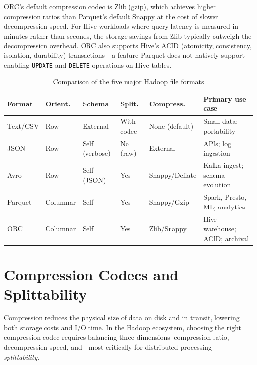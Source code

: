 ORC's default compression codec is Zlib (gzip), which achieves higher
compression ratios than Parquet's default Snappy at the cost of slower
decompression speed. For Hive workloads where query latency is measured
in minutes rather than seconds, the storage savings from Zlib typically
outweigh the decompression overhead. ORC also supports Hive's ACID
(atomicity, consistency, isolation, durability) transactions---a feature
Parquet does not natively support---enabling \texttt{UPDATE} and
\texttt{DELETE} operations on Hive tables.

\begin{table}[h!t]
\centering
\caption{Comparison of the five major Hadoop file formats}
\label{tab:format-comparison}
\renewcommand{\arraystretch}{1.5}
\begin{tabular}{L{1.6cm} L{1.6cm} L{2.0cm} L{1.4cm} L{1.8cm} L{2.6cm}}
\toprule
\textbf{Format} & \textbf{Orient.} & \textbf{Schema} & \textbf{Split.} &
\textbf{Compress.} & \textbf{Primary use case} \\
\midrule
Text/CSV  & Row      & External        & With codec  & None (default) & Small data; portability \\
JSON      & Row      & Self (verbose)  & No (raw)    & External       & APIs; log ingestion \\
Avro      & Row      & Self (JSON)     & Yes         & Snappy/Deflate & Kafka ingest; schema evolution \\
Parquet   & Columnar & Self            & Yes         & Snappy/Gzip    & Spark, Presto, ML; analytics \\
ORC       & Columnar & Self            & Yes         & Zlib/Snappy    & Hive warehouse; ACID; archival \\
\bottomrule
\end{tabular}
\end{table}

\section{Compression Codecs and Splittability}
\label{sec:compression}

Compression reduces the physical size of data on disk and in transit,
lowering both storage costs and I/O time. In the Hadoop ecosystem,
choosing the right compression codec requires balancing three
dimensions: compression ratio, decompression speed, and---most
critically for distributed processing---\emph{splittability}.

